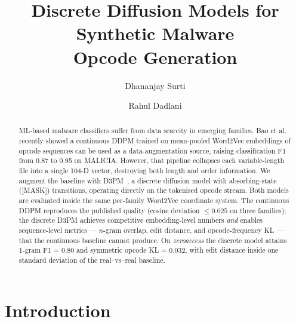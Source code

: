 \documentclass[runningheads]{llncs}
\begin{document}
\title{Discrete Diffusion Models for Synthetic Malware\\Opcode Generation}


\author{Dhananjay Surti \and Rahul Dadlani}



\maketitle

\begin{abstract}
ML-based malware classifiers suffer from data scarcity in emerging families.
Bao et al.~\cite{bao2025diffusion} recently showed a continuous DDPM trained
on mean-pooled Word2Vec embeddings of opcode sequences can be used as a
data-augmentation source, raising classification F1 from 0.87 to 0.95 on
MALICIA. However, that pipeline collapses each variable-length file into a
single 104-D vector, destroying both length and order information. We
augment the baseline with D3PM~\cite{austin2021d3pm}, a discrete diffusion
model with absorbing-state ([MASK]) transitions, operating directly on the
tokenised opcode stream. Both models are evaluated inside the same per-family
Word2Vec coordinate system. The continuous DDPM reproduces the published
quality (cosine deviation $\le 0.025$ on three families); the discrete D3PM
achieves competitive embedding-level numbers \emph{and} enables
sequence-level metrics --- $n$-gram overlap, edit distance, and opcode-frequency
KL --- that the continuous baseline cannot produce. On \emph{zeroaccess} the
discrete model attains 1-gram F1 = 0.80 and symmetric opcode KL = 0.032,
with edit distance inside one standard deviation of the real--vs--real
baseline.
\end{abstract}

\section{Introduction}
\label{sec:intro}
\end{document}
